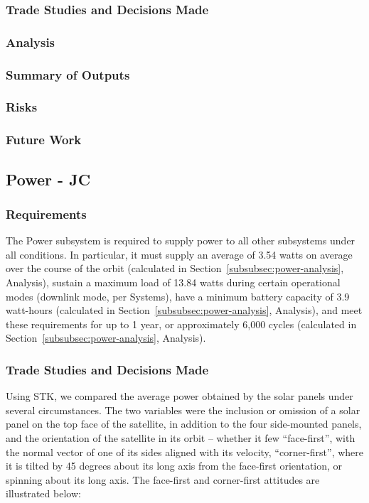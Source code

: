 \documentclass[12pt]{article}
\begin{document}
			\subsubsection{Trade Studies and Decisions Made}
			\subsubsection{Analysis}
			\subsubsection{Summary of Outputs}
			\subsubsection{Risks}
			\subsubsection{Future Work}
		\subsection{Power - JC}
			\subsubsection{Requirements}
			The Power subsystem is required to supply power to all other subsystems under all conditions.  In particular, it must supply an average of 3.54 watts on average over the course of the orbit (calculated in Section~\ref{subsubsec:power-analysis}, Analysis), sustain a maximum load of 13.84 watts during certain operational modes (downlink mode, per Systems), have a minimum battery capacity of 3.9 watt-hours (calculated in Section~\ref{subsubsec:power-analysis}, Analysis), and meet these requirements for up to 1 year, or approximately 6,000 cycles (calculated in Section~\ref{subsubsec:power-analysis}, Analysis).
			
			\subsubsection{Trade Studies and Decisions Made}
			Using STK, we compared the average power obtained by the solar panels under several circumstances.  The two variables were the inclusion or omission of a solar panel on the top face of the satellite, in addition to the four side-mounted panels, and the orientation of the satellite in its orbit -- whether it few ``face-first'', with the normal vector of one of its sides aligned with its velocity, ``corner-first'', where it is tilted by 45 degrees about its long axis from the face-first orientation, or spinning about its long axis.  The face-first and corner-first attitudes are illustrated below:
			
\end{document}
